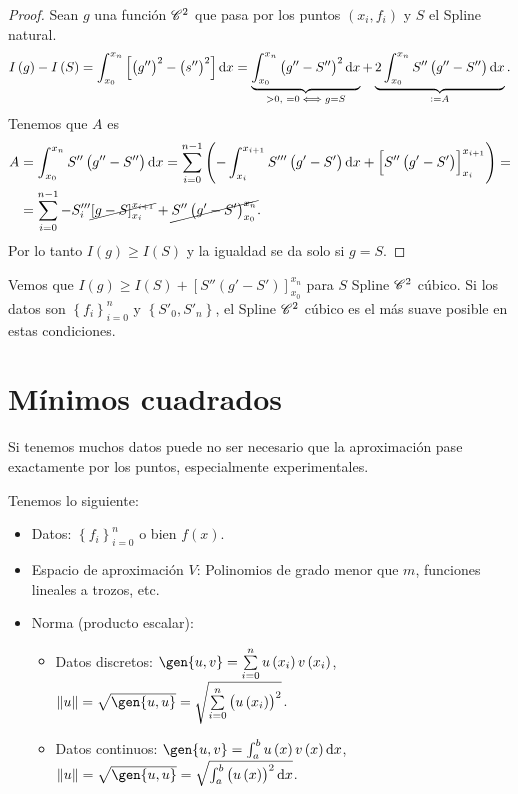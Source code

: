\begin{proof}
    Sean $g$ una función $\mathscr{C}^2$ que pasa por los puntos $\left( x_i, f_i \right)$ y $S$ el Spline natural.
    \[
        I\left( g \right) - I \left( S \right) = \int_{x_0}^{x_n} \left[ \left( g'' \right)^2 - \left( s'' \right)^2 \right] \dif x = \underbrace{\int_{x_0}^{x_n} \left( g''-S'' \right)^2 \dif x}_{>0,\,\, =0 \iff g=S} + \underbrace{2\int_{x_0}^{x_n} S''\left( g'' - S'' \right) \dif x}_{:= A}.
    \]
    Tenemos que $A$ es
    \begin{align*}
        A &= \int_{x_0}^{x_n} S''\left( g''-S'' \right) \dif x = \sum_{i=0}^{n-1} \left( -\int_{x_i}^{x_{i+1}} S'''\left( g'-S' \right) \dif x + \left[ S''\left( g' - S' \right) \right]_{x_i}^{x_{i+1}} \right) = \\
        &= \sum_{i=0}^{n-1} -S'''_i\cancel{\left[ g-S \right]_{x_i}^{x_{i+1}}} + \cancel{S''\left( g'-S' \right)_{x_0}^{x_n}}.
    \end{align*}
    Por lo tanto $I\left( g \right) \geq I\left( S \right)$ y la igualdad se da solo si $g = S$.
\end{proof}

\begin{obs}
    Vemos que $I\left( g \right) \geq I\left( S \right) + \left[ S''\left( g'-S' \right) \right]_{x_0}^{x_n}$ para $S$ Spline $\mathscr{C}^2$ cúbico. Si los datos son $\left\{ f_i \right\}_{i=0}^n$ y $\left\{ S'_0, S'_n \right\}$, el Spline $\mathscr{C}^2$ cúbico es el más suave posible en estas condiciones.
\end{obs}

\section{Mínimos cuadrados}
\begin{obs}
    Si tenemos muchos datos puede no ser necesario que la aproximación pase exactamente por los puntos, especialmente experimentales.
\end{obs}

Tenemos lo siguiente:
\begin{itemize}
    \item Datos: $\left\{ f_i \right\}_{i=0}^n$ o bien $f(x)$.
    \item Espacio de aproximación $V$: Polinomios de grado menor que $m$, funciones lineales a trozos, etc.
    \item Norma (producto escalar):
        \begin{itemize}
            \item Datos discretos: $\gen{u, v} = \sum\limits_{i=0}^n u\left( x_i \right) v\left( x_i \right)$, $\|u\| = \sqrt{\gen{u, u}} = \sqrt{\sum\limits_{i=0}^n\left( u\left( x_i \right) \right)^2}$.
            \item Datos continuos: $\gen{u, v} = \int_a^b u\left( x \right) v\left( x \right) \dif x$, $\|u\|=\sqrt{\gen{u, u}} = \sqrt{\int_a^b\left( u\left( x \right) \right)^2 \dif x}$.
        \end{itemize}
\end{itemize}
